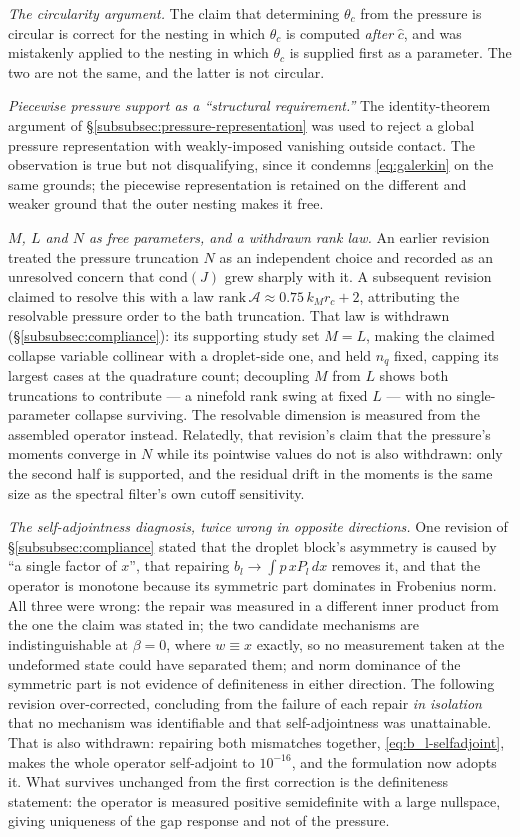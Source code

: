 \emph{The circularity argument.} The claim that determining $\theta_c$ from the pressure is circular is correct for the nesting in which $\theta_c$ is computed \emph{after} $\hat c$, and was mistakenly applied to the nesting in which $\theta_c$ is supplied first as a parameter. The two are not the same, and the latter is not circular.

\emph{Piecewise pressure support as a ``structural requirement.''} The identity-theorem argument of \S\ref{subsubsec:pressure-representation} was used to reject a global pressure representation with weakly-imposed vanishing outside contact. The observation is true but not disqualifying, since it condemns \eqref{eq:galerkin} on the same grounds; the piecewise representation is retained on the different and weaker ground that the outer nesting makes it free.

\emph{$M$, $L$ and $N$ as free parameters, and a withdrawn rank law.} An earlier revision treated the pressure truncation $N$ as an independent choice and recorded as an unresolved concern that $\mathrm{cond}(J)$ grew sharply with it. A subsequent revision claimed to resolve this with a law $\mathrm{rank}\,\mathcal A\approx0.75\,k_Mr_c+2$, attributing the resolvable pressure order to the bath truncation. That law is withdrawn (\S\ref{subsubsec:compliance}): its supporting study set $M=L$, making the claimed collapse variable collinear with a droplet-side one, and held $n_q$ fixed, capping its largest cases at the quadrature count; decoupling $M$ from $L$ shows both truncations to contribute --- a ninefold rank swing at fixed $L$ --- with no single-parameter collapse surviving. The resolvable dimension is measured from the assembled operator instead. Relatedly, that revision's claim that the pressure's moments converge in $N$ while its pointwise values do not is also withdrawn: only the second half is supported, and the residual drift in the moments is the same size as the spectral filter's own cutoff sensitivity.

\emph{The self-adjointness diagnosis, twice wrong in opposite directions.} One revision of \S\ref{subsubsec:compliance} stated that the droplet block's asymmetry is caused by ``a single factor of $x$'', that repairing $b_l\to\int p\,xP_l\,dx$ removes it, and that the operator is monotone because its symmetric part dominates in Frobenius norm. All three were wrong: the repair was measured in a different inner product from the one the claim was stated in; the two candidate mechanisms are indistinguishable at $\beta=0$, where $w\equiv x$ exactly, so no measurement taken at the undeformed state could have separated them; and norm dominance of the symmetric part is not evidence of definiteness in either direction. The following revision over-corrected, concluding from the failure of each repair \emph{in isolation} that no mechanism was identifiable and that self-adjointness was unattainable. That is also withdrawn: repairing both mismatches together, \eqref{eq:b_l-selfadjoint}, makes the whole operator self-adjoint to $10^{-16}$, and the formulation now adopts it. What survives unchanged from the first correction is the definiteness statement: the operator is measured positive semidefinite with a large nullspace, giving uniqueness of the gap response and not of the pressure.

